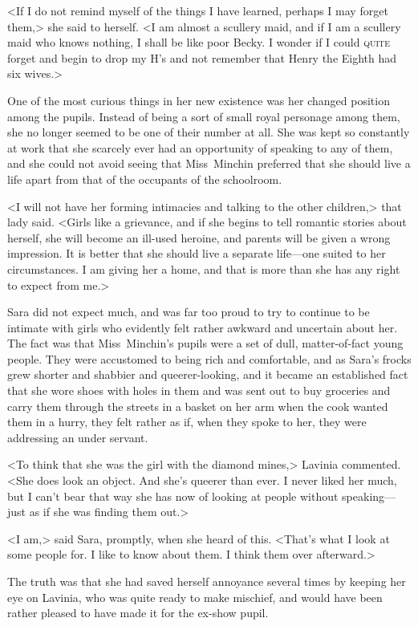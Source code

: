 <If I do not remind myself of the things I have learned, perhaps I may forget them,> she said to herself. <I am almost a scullery maid, and if I am a scullery maid who knows nothing, I shall be like poor Becky. I wonder if I could \textsc{quite} forget and begin to drop my H's and not remember that Henry the Eighth had six wives.>

One of the most curious things in her new existence was her changed position among the pupils. Instead of being a sort of small royal personage among them, she no longer seemed to be one of their number at all. She was kept so constantly at work that she scarcely ever had an opportunity of speaking to any of them, and she could not avoid seeing that Miss~Minchin preferred that she should live a life apart from that of the occupants of the schoolroom.

<I will not have her forming intimacies and talking to the other children,> that lady said. <Girls like a grievance, and if she begins to tell romantic stories about herself, she will become an ill-used heroine, and parents will be given a wrong impression. It is better that she should live a separate life—one suited to her circumstances. I am giving her a home, and that is more than she has any right to expect from me.>

Sara did not expect much, and was far too proud to try to continue to be intimate with girls who evidently felt rather awkward and uncertain about her. The fact was that Miss~Minchin's pupils were a set of dull, matter-of-fact young people. They were accustomed to being rich and comfortable, and as Sara's frocks grew shorter and shabbier and queerer-looking, and it became an established fact that she wore shoes with holes in them and was sent out to buy groceries and carry them through the streets in a basket on her arm when the cook wanted them in a hurry, they felt rather as if, when they spoke to her, they were addressing an under servant.

<To think that she was the girl with the diamond mines,> Lavinia commented. <She does look an object. And she's queerer than ever. I never liked her much, but I can't bear that way she has now of looking at people without speaking—just as if she was finding them out.>

<I am,> said Sara, promptly, when she heard of this. <That's what I look at some people for. I like to know about them. I think them over afterward.>

The truth was that she had saved herself annoyance several times by keeping her eye on Lavinia, who was quite ready to make mischief, and would have been rather pleased to have made it for the ex-show pupil.

